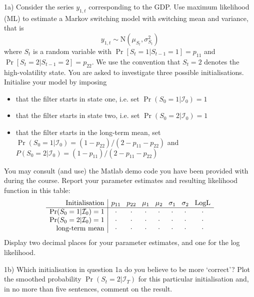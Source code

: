 \documentclass[12pt, a4paper]{article}
\begin{document}
\medskip\noindent 1a) Consider the series $y_{1,t}$ corresponding to the GDP. Use maximum likelihood (ML) to estimate a Markov  switching model with switching mean and variance, that is
\[
y_{1,t} \sim \mathrm{N}( \mu_{S_{t}} ,\sigma_{S_{t}}^{2})
\] 
where $S_{t}$ is a random variable with $\Pr[S_{t}=1|S_{t-1}=1]=p_{11}$ and $\Pr[S_{t}=2|S_{t-1}=2]=p_{22}$. We use the convention that $S_t=2$ denotes the high-volatility state. You are asked to investigate three possible initialisations. Initialise your model by imposing 
\begin{itemize}
\item that the filter starts in state one, i.e. set $\Pr(S_0=1|\mathcal{I}_0)=1$
\item that the filter starts in state two, i.e. set $\Pr(S_0=2|\mathcal{I}_0)=1$
\item that the filter starts in the long-term mean, set $\Pr(S_0=1|\mathcal{I}_0)=(1-p_{22}) / (2-p_{11}-p_{22})$ and $P(S_0=2|\mathcal{I}_0)=(1-p_{11}) / (2-p_{11}-p_{22})$
\end{itemize} 
You may consult (and use) the Matlab demo code you have been provided with during the course. Report your parameter estimates and resulting likelihood function in this table:
\[
\begin{array}{r|c@{\hspace{3mm}}c@{\hspace{3mm}}c@{\hspace{3mm}}c@{\hspace{3mm}}c@{\hspace{3mm}}c@{\hspace{3mm}}c}
\mbox{Initialisation} & p_{11} & p_{22} & \mu_1 & \mu_2 &\sigma_1 & \sigma_2 & \mbox{LogL}\\ 
   \hline
\Pr(S_0=1|\mathcal{I}_0)=1& \cdot & \cdot & \cdot  & \cdot  & \cdot  & \cdot & \cdot \\
\Pr(S_0=2|\mathcal{I}_0)=1& \cdot & \cdot & \cdot  & \cdot  & \cdot  & \cdot & \cdot\\
\text{long-term mean} & \cdot & \cdot & \cdot  & \cdot  & \cdot  & \cdot & \cdot
\end{array}
\]
Display two decimal places for your parameter estimates, and one for the log likelihood. 

\medskip\noindent 1b) Which initialisation in question 1a do you believe to be more `correct'? Plot the smoothed probability $\Pr(S_t=2|\mathcal{I}_T)$ for this particular initialisation and, in no more than five sentences, comment on the result. 
\end{document}
